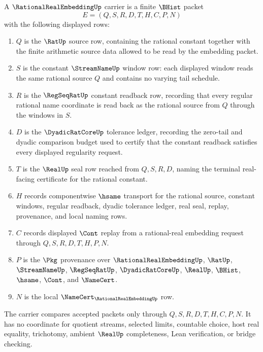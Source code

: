 \begin{definition}
\label{def:rational-real-embedding-carrier}
A $\RationalRealEmbeddingUp$ carrier is a finite $\BHist$ packet
$$
E=(Q,S,R,D,T,H,C,P,N)
$$
with the following displayed rows:
\begin{enumerate}
\item $Q$ is the $\RatUp$ source row, containing the rational constant together with the finite arithmetic source data allowed to be read by the embedding packet.
\item $S$ is the constant $\StreamNameUp$ window row: each displayed window reads the same rational source $Q$ and contains no varying tail schedule.
\item $R$ is the $\RegSeqRatUp$ constant readback row, recording that every regular rational name coordinate is read back as the rational source from $Q$ through the windows in $S$.
\item $D$ is the $\DyadicRatCoreUp$ tolerance ledger, recording the zero-tail and dyadic comparison budget used to certify that the constant readback satisfies every displayed regularity request.
\item $T$ is the $\RealUp$ seal row reached from $Q,S,R,D$, naming the terminal real-facing certificate for the rational constant.
\item $H$ records componentwise $\hsame$ transport for the rational source, constant windows, regular readback, dyadic tolerance ledger, real seal, replay, provenance, and local naming rows.
\item $C$ records displayed $\Cont$ replay from a rational-real embedding request through $Q,S,R,D,T,H,P,N$.
\item $P$ is the $\Pkg$ provenance over $\RationalRealEmbeddingUp$, $\RatUp$, $\StreamNameUp$, $\RegSeqRatUp$, $\DyadicRatCoreUp$, $\RealUp$, $\BHist$, $\hsame$, $\Cont$, and $\NameCert$.
\item $N$ is the local $\NameCert_{\RationalRealEmbeddingUp}$ row.
\end{enumerate}
The carrier compares accepted packets only through $Q,S,R,D,T,H,C,P,N$. It has no coordinate for quotient streams, selected limits, countable choice, host real equality, trichotomy, ambient $\RealUp$ completeness, Lean verification, or bridge checking.
\end{definition}

